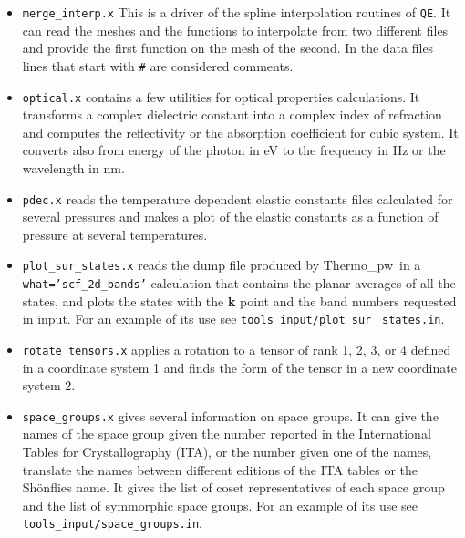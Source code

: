 \documentclass[12pt,a4paper,twoside]{report}
\def\thermo{{\sc Thermo}\_{\sc pw}}
\begin{document}
\begin{itemize}
\item \texttt{merge\_interp.x} This is a driver of the spline
interpolation routines of \texttt{QE}. It can read the meshes and the
functions to interpolate from two different files and provide the
first function on the mesh of the second. In the data files
lines that start with \texttt{\#} are considered comments.

\item \texttt{optical.x} contains a few utilities for
optical properties calculations. It transforms a complex dielectric 
constant into a complex index of refraction and computes the reflectivity 
or the absorption coefficient for cubic system. It converts also from 
energy of the photon in eV to the frequency in Hz or the wavelength in nm.

\item \texttt{pdec.x} reads the temperature dependent elastic constants files 
calculated for several pressures and makes a plot of the elastic constants as
a function of pressure at several temperatures.

\item \texttt{plot\_sur\_states.x} reads the dump file produced
by \thermo\ in a \texttt{what='scf\_2d\_bands'} calculation that
contains the planar averages of all the states, and plots
the states with the {\bf k} point and the band numbers requested in input.
For an example of its use see \texttt{tools\_input/plot\_sur\_}
\texttt{states.in}.

\item \texttt{rotate\_tensors.x} applies a rotation to a tensor
of rank 1, 2, 3, or 4 defined in a coordinate system 1 and finds the form
of the tensor in a new coordinate system 2. 

\item \texttt{space\_groups.x} gives several information on space groups.
It can give the names of the space group given the number reported in
the International Tables for Crystallography (ITA), or
the number given one of the names, translate the names between different
editions of the ITA tables or the Sh\"onflies name. It gives the list 
of coset representatives of each space group and the list of symmorphic 
space groups.
For an example of its use see \texttt{tools\_input/space\_groups.in}.


\end{itemize}
\end{document}
